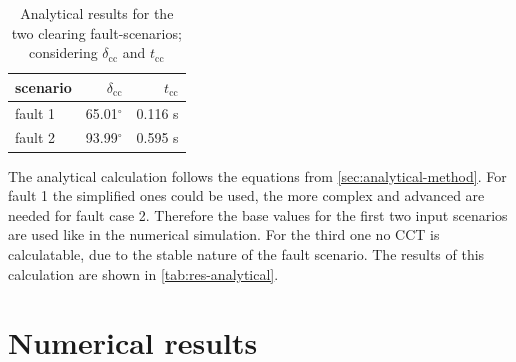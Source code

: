 \begin{table}
        \vspace{-12pt}
        \small
        \centering
        \caption[Analytical results for the two clearing fault-scenarios]{Analytical results for the two clearing fault-scenarios; considering $\delta_\mathrm{cc}$ and $t_\mathrm{cc}$}
        \label{tab:res-analytical}
        \vspace{12pt}
        \begin{tabular}{|l|r|r|}
                \hline
                \rowcolor{lightgray} scenario & $\delta_\mathrm{cc}$ & $t_\mathrm{cc}$  \\ \hline \hline
                fault 1              & 65.01$^\circ$        & 0.116 s                         \\ \hline
                fault 2              & 93.99$^\circ$        & 0.595 s \\ \hline
        \end{tabular}
\end{table}
The analytical calculation follows the equations from \autoref{sec:analytical-method}. For fault 1 the simplified ones could be used, the more complex and advanced are needed for fault case 2. Therefore the base values for the first two input scenarios are used like in the numerical simulation. For the third one no \acs{CCT} is calculatable, due to the stable nature of the fault scenario. The results of this calculation are shown in \autoref{tab:res-analytical}.


\section{Numerical results}

